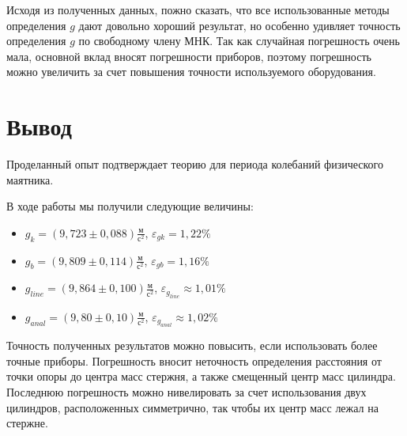 	
	Исходя из полученных данных, пожно сказать, что все использованные методы определения $g$ дают довольно хороший результат, но особенно удивляет точность определения $g$ по свободному члену МНК. Так как случайная погрешность очень мала, основной вклад вносят погрешности приборов, поэтому погрешность можно увеличить за счет повышения точности используемого оборудования.
	
	
	\section{Вывод}
	Проделанный опыт подтверждает теорию для периода колебаний физического маятника. 
	
	В ходе работы мы получили следующие величины:

		\begin{itemize}
			
			\item $ g_k = \left( 9,723\pm 0,088\right) \frac{\text{м}}{\text{с}^2} $, $ \varepsilon_{gk} = 1,22\% $
			
			\item $ g_b = \left( 9,809\pm 0,114\right) \frac{\text{м}}{\text{с}^2} $, $ \varepsilon_{gb} = 1,16\% $
			
			\item $ g_{line}= \left( 9,864\pm 0,100\right) \frac{\text{м}}{\text{с}^2} $, $ \varepsilon_{g_{line}} \approx 1,01\% $
			
			\item $ g_{anal}= \left( 9,80\pm 0,10\right) \frac{\text{м}}{\text{с}^2} $, $ \varepsilon_{g_{anal}} \approx 1,02\% $
			
		\end{itemize}

	
	
	Точность полученных результатов можно повысить, если использовать более точные приборы. Погрешность вносит неточность определения расстояния от точки опоры до центра масс стержня, а также смещенный центр масс цилиндра. Последнюю погрешность можно нивелировать за счет использования двух цилиндров, расположенных симметрично, так чтобы их центр масс лежал на стержне.
	
	
	
	
	
	
